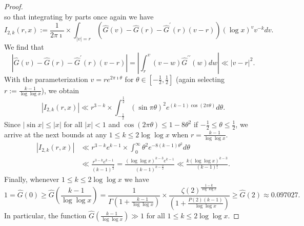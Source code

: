 \documentclass[11pt,reqno,a4letter]{article}
\numberwithin{equation}{section}
\numberwithin{figure}{section}
\numberwithin{table}{section}
\theoremstyle{plain}
\numberwithin{theorem}{section}
\theoremstyle{definition}
\begin{document}
\begin{proof}
\[\]
so that integrating by parts once again we have 
\[
I_{2,k}(r, x) := \frac{1}{2\pi\imath} \times \int_{|v|=r} 
     \left(\widehat{G}(v) - \widehat{G}(r) - 
     \widehat{G}^{\prime}(r)(v-r)\right) 
     (\log x)^{v} v^{-k} dv. 
\]
We find that 
\[
\left\lvert \widehat{G}(v) - \widehat{G}(r) - \widehat{G}^{\prime}(r)(v-r) \right\rvert = 
     \left\lvert \int_{r}^{v} (v-w) \widehat{G}^{\prime\prime}(w) dw \right\rvert 
     \ll |v-r|^2. 
\]
With the parameterization $v = re^{2\pi\imath\theta}$ for 
$\theta \in \left[-\frac{1}{2}, \frac{1}{2}\right]$ 
(again selecting $r := \frac{k-1}{\log\log x}$), we obtain 
\[
|I_{2,k}(r, x)| \ll r^{3-k} \times 
     \int_{-\frac{1}{2}}^{\frac{1}{2}} (\sin \pi\theta)^2 e^{(k-1) \cos(2\pi\theta)} d\theta. 
\]
Since $|\sin x| \leq |x|$ for all $|x| < 1$ and $\cos(2\pi\theta) \leq 1 - 8\theta^2$ if 
$-\frac{1}{2} \leq \theta \leq \frac{1}{2}$, we arrive at the next bounds 
at any $1 \leq k \leq 2\log\log x$ when $r = \frac{k-1}{\log\log x}$. 
\begin{align*}
|I_{2,k}(r, x)| & \ll r^{3-k} e^{k-1} \times \int_0^{\infty} \theta^2 e^{-8(k-1) \theta^2} d\theta \\ 
     & \ll \frac{r^{3-k} e^{k-1}}{(k-1)^{\frac{3}{2}}} = 
     \frac{(\log\log x)^{k-3} e^{k-1}}{(k-1)^{k-\frac{3}{2}}} 
     \ll 
     \frac{k (\log\log x)^{k-3}}{(k-1)!}. 
\end{align*}
Finally, whenever $1 \leq k \leq 2\log\log x$ we have 
\[
1 = \widehat{G}(0) \geq \widehat{G}\left(\frac{k-1}{\log\log x}\right) = 
     \frac{1}{\Gamma\left(1+\frac{k-1}{\log\log x}\right)} \times 
     \frac{\zeta(2)^{\frac{1-k}{\log\log x}}}{\left(1+\frac{P(2)(k-1)}{\log\log x}\right)} 
     \geq \widehat{G}(2) \approx 0.097027. 
\]
In particular, the function 
$\widehat{G}\left(\frac{k-1}{\log\log x}\right) \gg 1$ for 
all $1 \leq k \leq 2\log\log x$. 
\end{proof} 
\end{document}
